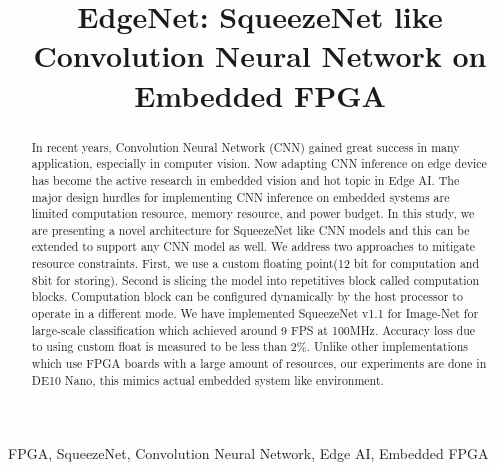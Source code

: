 \documentclass[conference]{IEEEtran}
\begin{document}
\title{EdgeNet: SqueezeNet like Convolution Neural Network on Embedded FPGA\\
}

\author{
\and
{}
\and
{}

}

\maketitle

\begin{abstract}
In recent years, Convolution Neural Network (CNN) gained great success in many application, especially in computer vision. Now adapting CNN inference on edge device has become the active research in embedded vision and hot topic in Edge AI. The major design hurdles for implementing CNN inference on embedded systems are limited computation resource, memory resource, and power budget. In this study, we are presenting a novel architecture for SqueezeNet like CNN models and this can be extended to support any CNN model as well. We address two approaches to mitigate resource constraints. First, we use a custom floating point(12 bit for computation and 8bit for storing). Second is slicing the model into repetitives block called computation blocks. Computation block can be configured dynamically by the host processor to operate in a different mode. We have implemented SqueezeNet v1.1 for Image-Net for large-scale classification which achieved around 9 FPS at 100MHz. Accuracy loss due to using custom float is measured to be less than 2\%. Unlike other implementations which use FPGA boards with a large amount of resources, our experiments are done in DE10 Nano, this mimics actual embedded system like environment.

\end{abstract}

\begin{IEEEkeywords}
FPGA, SqueezeNet, Convolution Neural Network,  Edge AI,  Embedded FPGA
\end{IEEEkeywords}
\end{document}
